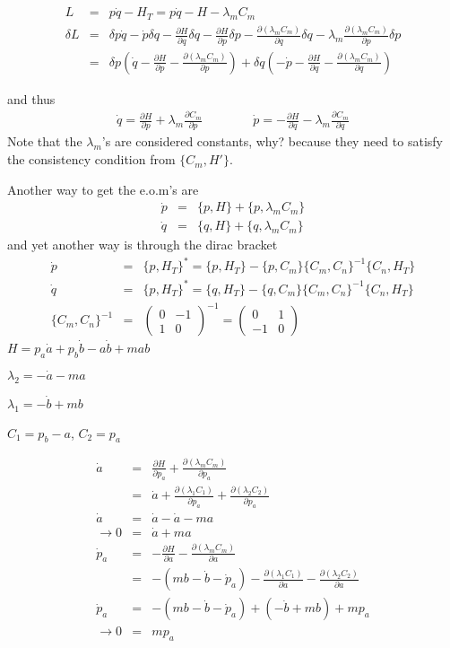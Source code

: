 \documentclass[aps,preprint,preprintnumbers,nofootinbib,showpacs,prd]{revtex4-1}
\newcommand{\nbea}{\begin{eqnarray*}}
\newcommand{\neea}{\end{eqnarray*}}
\begin{document}
%
\nbea
L & = & p\dot q - H_T = p\dot q - H - \lambda_m C_m \\
\delta L & = & \delta p \dot q - \dot p \delta q - \frac{\partial H}{\partial q} \delta q - \frac{\partial H}{\partial p}\delta p - \frac{\partial (\lambda_m C_m)}{\partial q}\delta q - \lambda_m \frac{\partial (\lambda_m C_m)}{\partial p}\delta p \\
& = & \delta p \left ( \dot q  - \frac{\partial H}{\partial p} - \frac{\partial (\lambda_m C_m)}{\partial p} \right ) + \delta q \left ( - \dot p - \frac{\partial H}{\partial q} - \frac{\partial (\lambda_m C_m)}{\partial q}\right )
\neea
%

and thus
%
\nbea
\dot q  = \frac{\partial H}{\partial p} + \lambda_m \frac{\partial C_m}{\partial p} &~~~~~~~~~~~& \dot p = - \frac{\partial H}{\partial q} - \lambda_m \frac{\partial C_m}{\partial q}
\neea
%
Note that the $\lambda_m$'s are considered constants, why? because they need to satisfy the consistency condition from $\{C_m, H'\}$.

Another way to get the e.o.m's are
%
\nbea
\dot p & = & \{p, H\} + \{p, \lambda_m C_m\} \\
\dot q & = & \{q, H\} + \{q, \lambda_m C_m\}
\neea
%
and yet another way is through the dirac bracket
%
\nbea
\dot p & = & \{p, H_T\}^* = \{p, H_T\} - \{p, C_m\}\{C_m, C_n\}^{-1}\{C_n, H_T\} \\
\dot q & = & \{p, H_T\}^* = \{q, H_T\} - \{q, C_m\}\{C_m, C_n\}^{-1}\{C_n, H_T\} \\
\{C_m, C_n\}^{-1} & = & \left ( \begin{array}{cc}
0 & -1 \\
1 & 0
\end{array} \right )^{-1} = \left ( \begin{array}{cc}
0 & 1 \\
-1 & 0
\end{array} \right )
\neea
%
$H= p_a \dot a + p_b \dot b - a\dot b + m ab $

$\lambda_2 = -\dot a - ma$

$\lambda_1 = - \dot b + mb$

$C_1 = p_b - a$, $C_2 = p_a$

%
\nbea
\dot a & = & \frac{\partial H}{\partial p_a} +  \frac{\partial (\lambda_m C_m)}{\partial p_a} \\
& = & \dot a + \frac{\partial (\lambda_1 C_1)}{\partial p_a} + \frac{\partial (\lambda_2 C_2)}{\partial p_a} \\
\dot a & = & \dot a - \dot a - ma \\
\to 0 & = & \dot a + ma  \\
\dot p_a & = & - \frac{\partial H}{\partial a} - \frac{\partial (\lambda_m C_m)}{\partial a} \\
& = & -(mb - \dot b - \dot p_a) - \frac{\partial (\lambda_1 C_1)}{\partial a} - \frac{\partial (\lambda_2 C_2)}{\partial a} \\
\dot p_a & = & -(mb - \dot b - \dot p_a) + (- \dot b + mb) + mp_a \\
\to 0 & = & mp_a
\neea
%
\end{document}
